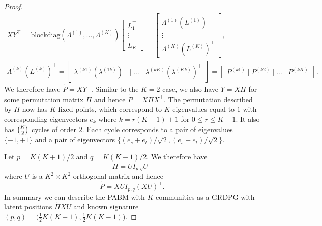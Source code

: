 \documentclass[
  12pt,
]{article}
\theoremstyle{definition}
\theoremstyle{definition}
\theoremstyle{definition}
\theoremstyle{definition}
\theoremstyle{remark}
\begin{document}
\begin{proof}
\begin{gather*}
XY^{\top} = \mathrm{blockdiag}(\Lambda^{(1)}, \dots,
\Lambda^{(K)}) \begin{bmatrix} L_1^{\top} \\ \vdots \\
L_{K}^{\top} \end{bmatrix} = \begin{bmatrix} \Lambda^{(1)}
(L^{(1)})^{\top} \\ \vdots \\
\Lambda^{(K)} (L^{(K)})^{\top} \end{bmatrix}, \\
\Lambda^{(k)} (L^{(k)})^{\top} = \begin{bmatrix} \lambda^{(k1)}
(\lambda^{(1k)})^{\top} \mid \dots \mid \lambda^{(kK)}
(\lambda^{(Kk)})^{\top} \end{bmatrix} = \begin{bmatrix} P^{(k1)}
\mid P^{(k2)} \mid \dots \mid P^{(kK)} \end{bmatrix}.
\end{gather*}
We therefore have $\tilde{P} = X Y^\top$. 
Similar to the $K = 2$ case, we also have $Y = X \Pi$ for some permutation matrix
$\Pi$ and hence $\tilde{P} = X \Pi X^\top$.
The permutation described by $\Pi$ now has $K$ fixed points, which correspond to
$K$ eigenvalues equal to $1$ with corresponding eigenvectors $e_k$ where
$k = r (K + 1) + 1$ for $0 \leq r \leq K - 1$. It also has
$\tbinom{K}{2}$ cycles of order $2$. Each cycle corresponds to
a pair of eigenvalues $\{-1,+1\}$ and a pair of eigenvectors
$\{(e_s + e_t)/\sqrt{2},(e_s - e_t)/ \sqrt{2}\}$. 

Let $p = K (K + 1) / 2$ and $q = K (K - 1) / 2$. 
We therefore have
\begin{equation} \label{eq:permutation}
\Pi = U I_{p,q} U^\top
\end{equation}
where $U$ is a $K^2 \times K^2$ orthogonal matrix and hence
\begin{equation} \label{eq:pabm-grdpg}
\tilde{P} = X U I_{p, q} (X U)^\top.
\end{equation}
In summary we can describe the PABM with $K$ communities as a GRDPG with latent
positions $\tilde{\Pi} X U$ and known signature $(p,q) = \bigl( \tfrac{1}{2} K (K + 1) ,
\tfrac{1}{2} K (K - 1)\bigr)$.
\end{proof}
\end{document}
